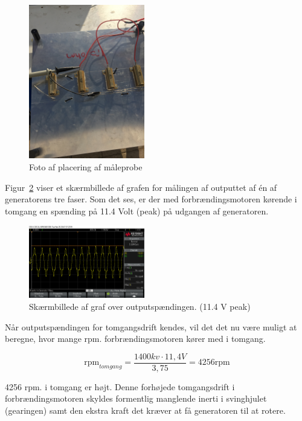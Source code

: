 \begin{figure}[h]
  \centering
  \includegraphics[width=0.45\textwidth]{loadstjernekobling.JPG}
  \caption{Foto af placering af måleprobe}
  \label{fig:testsetup2}
\end{figure}

Figur~\ref{fig:scope1} viser et skærmbillede af grafen for målingen af outputtet af én af generatorens tre faser.  
Som det ses, er der med forbrændingsmotoren kørende i tomgang en spænding på 11.4 Volt (peak) på udgangen af generatoren. 

\begin{figure}[h]
  \centering
  \includegraphics[width=0.45\textwidth]{scope0.png}
  \caption{Skærmbillede af graf over outputspændingen. (11.4 V peak)}
  \label{fig:scope1}
\end{figure}

Når outputspændingen for tomgangsdrift kendes, vil det det nu være muligt at beregne, hvor mange rpm. forbrændingsmotoren kører med i tomgang.

\begin{equation}
  \label{eq:1}
  \mathrm{rpm}_{tomgang}=\frac{1400kv\cdot 11,4V}{3,75}=4256 \mathrm{rpm}
\end{equation}

4256 rpm. i tomgang er højt. Denne forhøjede tomgangsdrift i forbrændingsmotoren skyldes formentlig manglende inerti i svinghjulet (gearingen) samt den ekstra kraft det kræver at få generatoren til at rotere.

